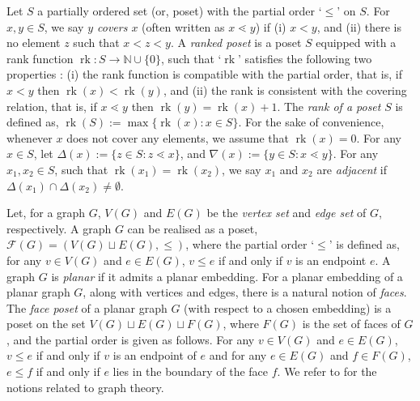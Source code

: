 \documentclass[12pt]{article}
\theoremstyle{definition}
\theoremstyle{remark}
\newcommand{\rk}{\operatorname{rk}}
\begin{document}
	Let $S$ a partially ordered set (or, poset) with the partial order `$\leq$' on $S$. For $x,y \in S$, we say \emph{$y$ covers $x$} (often written as $x\lessdot y$) if (i) $x<y$, and (ii) there is no element $z$ such that $x<z<y$. A \emph{ranked poset} is a poset $S$ equipped with a rank function $\rk:S \rightarrow \mathbb{N}\cup \{0\}$, such that `$\rk$' satisfies the following two properties : (i) the rank function is compatible with the partial order, that is, if $x < y$ then $\rk(x) < \rk(y)$, and
	(ii) the rank is consistent with the covering relation, that is, if $x \lessdot y$ then $\rk(y) = \rk(x)+1$.  The \emph{rank of a poset} $S$ is defined as, $\rk(S):= \max\{\rk(x): x \in S\}$. For the sake of convenience, whenever $x$ does not cover any elements, we assume that $\rk(x)=0$. For any $x\in S$, let $\Delta(x):= \{z\in S: z \lessdot x\}$, and $\nabla(x):= \{y\in S: x \lessdot y\}$.
	For any $x_1,x_2\in S$, such that $\rk(x_1)=\rk(x_2)$, we say $x_1$ and $x_2$ are \emph{adjacent} if $\Delta(x_1)\cap \Delta(x_2)\neq \emptyset$.
	
    Let, for a graph $G$, $V(G)$ and $E(G)$ be the \emph{vertex set} and \emph{edge set} of $G$, respectively. A graph $G$ can be realised as a poset, $\mathcal{F}(G)=(V(G)\sqcup E(G),\leq)$, where the partial order `$\leq$' is defined as, for any $v\in V(G)$ and $e\in E(G)$, $v \leq e$ if and only if $v$ is an endpoint $e$. A graph $G$ is \emph{planar} if it admits a planar embedding. For a planar embedding of a planar graph $G$, along with vertices and edges, there is a natural notion of \emph{faces}. The \emph{face poset} of a planar graph $G$ (with respect to a chosen embedding) is a poset on the set $V(G)\sqcup E(G)\sqcup F(G)$, where $F(G)$ is the set of faces of $G$, and the partial order is given as follows. For any $v\in V(G)$ and $e\in E(G)$, $v \leq e$ if and only if $v$ is an endpoint of $e$ and for any $e\in E(G)$ and $f\in F(G)$, $e \leq f$ if and only if $e$ lies in the boundary of the face $f$. We refer to \cite{diestel} for the notions related to graph theory.
    
\end{document}
